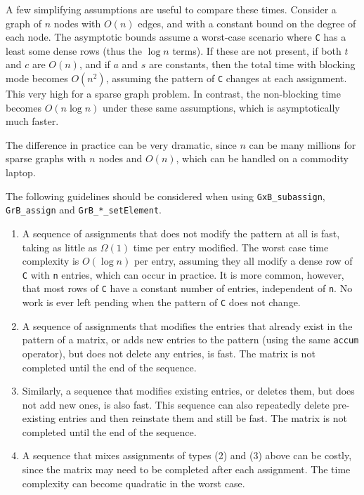\documentclass[12pt]{article}
\begin{document}
{A few simplifying assumptions are useful to compare these times.  Consider a
graph of $n$ nodes with $O(n)$ edges, and with a constant bound on the degree
of each node.  The asymptotic bounds assume a worst-case scenario where
\verb'C' has a least some dense rows (thus the $\log n$ terms).  If these
are not present, if both $t$ and $c$ are $O(n)$, and if $a$ and $s$ are
constants, then the total time with blocking mode becomes $O(n^2)$, assuming
the pattern of \verb'C' changes at each assignment.  This very high for a
sparse graph problem.  In contrast, the non-blocking time becomes $O(n \log n)$
under these same assumptions, which is asymptotically much faster.

\newpage
The difference in practice can be very dramatic, since $n$ can be many millions
for sparse graphs with $n$ nodes and $O(n)$, which can be handled on a
commodity laptop.

The following guidelines should be considered when using
\verb'GxB_subassign', \verb'GrB_assign' and \verb'GrB_*_setElement'.

\begin{enumerate}

\item A sequence of assignments that does not modify the pattern at all is
fast, taking as little as $\Omega(1)$ time per entry modified.  The worst case
time complexity is $O(\log n)$ per entry, assuming they all modify a dense
row of \verb'C' with \verb'n' entries, which can occur in practice.  It is
more common, however, that most rows of \verb'C' have a constant number of
entries, independent of \verb'n'.  No work is ever left pending when the
pattern of \verb'C' does not change.

\item A sequence of assignments that modifies the entries that already exist in
the pattern of a matrix, or adds new entries to the pattern (using the same
\verb'accum' operator), but does not delete any entries, is fast.  The matrix
is not completed until the end of the sequence.

\item Similarly, a sequence that modifies existing entries, or deletes them,
but does not add new ones, is also fast.  This sequence can also repeatedly
delete pre-existing entries and then reinstate them and still be fast.  The
matrix is not completed until the end of the sequence.

\item A sequence that mixes assignments of types (2) and (3) above can be
costly, since the matrix may need to be completed after each assignment.  The
time complexity can become quadratic in the worst case.


\end{enumerate}}
\end{document}
